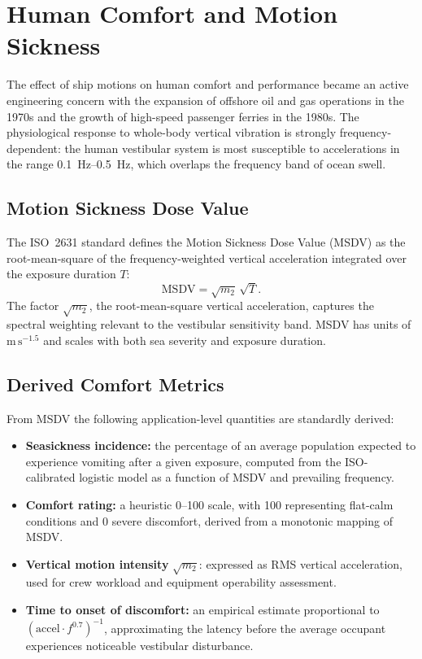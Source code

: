 \documentclass[journal]{IEEEtran}
\begin{document}
    \section{Human Comfort and Motion Sickness}
    \label{sec:comfort}

    The effect of ship motions on human comfort and performance became an
    active engineering concern with the expansion of offshore oil and gas
    operations in the 1970s and the growth of high-speed passenger ferries
    in the 1980s.
    The physiological response to whole-body vertical vibration is
    strongly frequency-dependent: the human vestibular system is most
    susceptible to accelerations in the range \SIrange{0.1}{0.5}{\hertz},
    which overlaps the frequency band of ocean swell.

    \subsection{Motion Sickness Dose Value}

    The ISO~2631 standard \cite{ISO2631} defines the Motion Sickness
    Dose Value (MSDV) as the root-mean-square of the frequency-weighted
    vertical acceleration integrated over the exposure duration $T$:
    \begin{equation}
        \mathrm{MSDV} = \sqrt{m_2}\,\sqrt{T}.
        \label{eq:msdv}
    \end{equation}
    The factor $\sqrt{m_2}$, the root-mean-square vertical acceleration,
    captures the spectral weighting relevant to the vestibular sensitivity
    band.
    MSDV has units of $\mathrm{m\,s^{-1.5}}$ and scales with both sea
    severity and exposure duration.

    \subsection{Derived Comfort Metrics}

    From MSDV the following application-level quantities are standardly
    derived:
    \begin{itemize}
        \item \textbf{Seasickness incidence:} the percentage of an average
        population expected to experience vomiting after a given
        exposure, computed from the ISO-calibrated logistic model
        as a function of MSDV and prevailing frequency.
        \item \textbf{Comfort rating:} a heuristic 0--100 scale, with 100
        representing flat-calm conditions and 0 severe discomfort,
        derived from a monotonic mapping of MSDV.
        \item \textbf{Vertical motion intensity} $\sqrt{m_2}$: expressed as
        RMS vertical acceleration, used for crew workload and
        equipment operability assessment.
        \item \textbf{Time to onset of discomfort:} an empirical estimate
        proportional to $(\mathrm{accel} \cdot f^{0.7})^{-1}$,
        approximating the latency before the average occupant
        experiences noticeable vestibular disturbance.
    \end{itemize}
\end{document}
